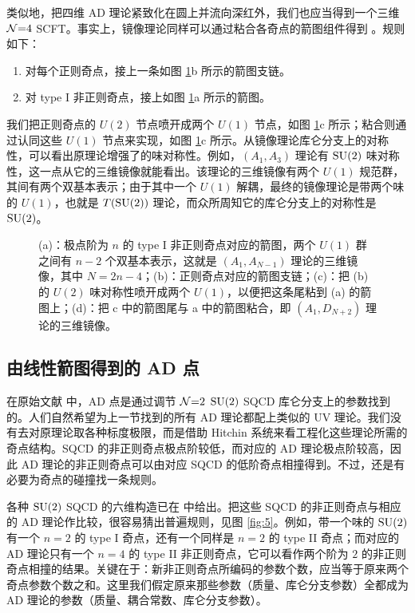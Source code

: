 类似地，把四维 AD 理论紧致化在圆上并流向深红外，我们也应当得到一个三维 $\mathcal{N}{=}4$ SCFT。事实上，镜像理论同样可以通过粘合各奇点的箭图组件得到 \cite{39,40}。规则如下：
\begin{enumerate}[label=\textup{\alph*.}]
  \item 对每个正则奇点，接上一条如图 \ref{fig:4}b 所示的箭图支链。
  \item 对 type I 非正则奇点，接上如图 \ref{fig:4}a 所示的箭图。
\end{enumerate}
我们把正则奇点的 $U(2)$ 节点喷开成两个 $U(1)$ 节点，如图 \ref{fig:4}c 所示；粘合则通过认同这些 $U(1)$ 节点来实现，如图 \ref{fig:4}c 所示。从镜像理论库仑分支上的对称性，可以看出原理论增强了的味对称性。例如，$(A_1,A_3)$ 理论有 $\operatorname{SU}(2)$ 味对称性，这一点从它的三维镜像就能看出。该理论的三维镜像有两个 $U(1)$ 规范群，其间有两个双基本表示；由于其中一个 $U(1)$ 解耦，最终的镜像理论是带两个味的 $U(1)$，也就是 $T(\operatorname{SU}(2))$ 理论，而众所周知它的库仑分支上的对称性是 $\operatorname{SU}(2)$。

\begin{figure}[tbp]
\centering

\caption{(a)：极点阶为 $n$ 的 type I 非正则奇点对应的箭图，两个 $U(1)$ 群之间有 $n-2$ 个双基本表示，这就是 $(A_1,A_{N-1})$ 理论的三维镜像，其中 $N=2n-4$；(b)：正则奇点对应的箭图支链；(c)：把 (b) 的 $U(2)$ 味对称性喷开成两个 $U(1)$，以便把这条尾粘到 (a) 的箭图上；(d)：把 c 中的箭图尾与 a 中的箭图粘合，即 $(A_1,D_{N+2})$ 理论的三维镜像。}
\label{fig:4}
\end{figure}

\subsection{由线性箭图得到的 AD 点}
\label{sec:4.3}

在原始文献 \cite{6,11} 中，AD 点是通过调节 $\mathcal{N}{=}2$ $\operatorname{SU}(2)$ SQCD 库仑分支上的参数找到的。人们自然希望为上一节找到的所有 AD 理论都配上类似的 UV 理论。我们没有去对原理论取各种标度极限，而是借助 Hitchin 系统来看工程化这些理论所需的奇点结构。SQCD 的非正则奇点极点阶较低，而对应的 AD 理论极点阶较高，因此 AD 理论的非正则奇点可以由对应 SQCD 的低阶奇点相撞得到。不过，还是有必要为奇点的碰撞找一条规则。

各种 $\operatorname{SU}(2)$ SQCD 的六维构造已在 \cite{3,41} 中给出。把这些 SQCD 的非正则奇点与相应的 AD 理论作比较，很容易猜出普遍规则，见图 \ref{fig:5}。例如，带一个味的 $\operatorname{SU}(2)$ 有一个 $n=2$ 的 type I 奇点，还有一个同样是 $n=2$ 的 type II 奇点；而对应的 AD 理论只有一个 $n=4$ 的 type II 非正则奇点，它可以看作两个阶为 $2$ 的非正则奇点相撞的结果。关键在于：新非正则奇点所编码的参数个数，应当等于原来两个奇点参数个数之和。这里我们假定原来那些参数（质量、库仑分支参数）全都成为 AD 理论的参数（质量、耦合常数、库仑分支参数）。

